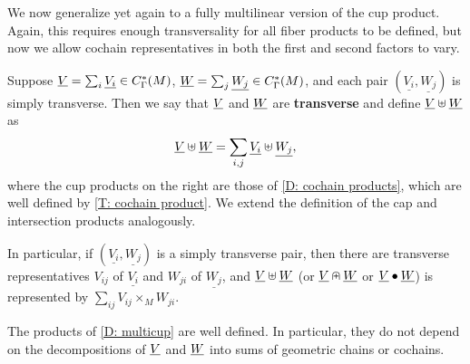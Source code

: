 We now generalize yet again to a fully multilinear version of the cup product. Again, this requires enough transversality for all fiber products to be defined, but now we allow cochain representatives in both the first and second factors to vary.

\begin{definition}\label{D: multicup}
Suppose $\underline{V}=\sum_i \underline{V_i}\in C_\Gamma^*(M)$, $\underline{W}=\sum_j \underline{W_j}\in C_\Gamma^*(M)$, and each pair $(\underline{V_i},\underline{W_j})$ is simply transverse. Then we say that $\underline{V}$ and $\underline{W}$ are \textbf{transverse} and define $\underline{V}\uplus\underline{W}$ as 
$$\underline{V}\uplus\underline{W}=\sum_{i,j} \underline{V_i}\uplus \underline{W_j},$$
where the cup products on the right are those of \cref{D: cochain products}, which are well defined by \cref{T: cochain product}.
We extend the definition of the cap and intersection products analogously.

In particular, if $(\underline{V_i},\underline{W_j})$ is a simply transverse pair, then there are transverse representatives $V_{ij}$ of $\underline{V_i}$ and $W_{ji}$ of $\underline{W_j}$, and $\underline{V}\uplus \underline{W}$ (or $\underline{V}\nplus \underline{W}$ or $\underline{V}\bullet\underline{W}$) is represented by $\sum_{ij}V_{ij}\times_M W_{ji}$.
\end{definition}



\begin{theorem}\label{T: multicup}
The products of \cref{D: multicup} are well defined. In particular, they do not depend on the decompositions of $\underline{V}$ and $\underline{W}$ into sums of geometric chains or cochains.
\end{theorem}

